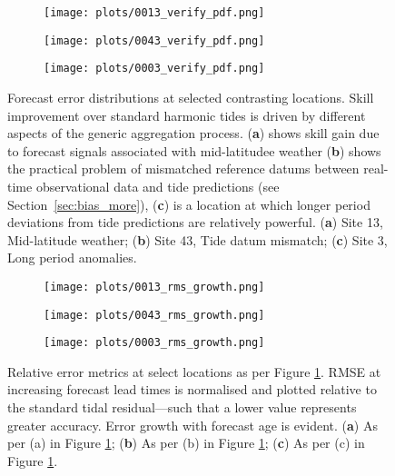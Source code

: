 \documentclass[jmse,article,accept,moreauthors,pdftex,10pt,a4paper]{mdpi}
\begin{document}
\begin{figure}[H]
    \centering
    \begin{subfigure}{0.30\textwidth}
    \texttt{[image: plots/0013\_verify\_pdf.png]}
    \caption{}
    \end{subfigure}
    \begin{subfigure}{0.30\textwidth}
    \texttt{[image: plots/0043\_verify\_pdf.png]}
    \caption{}
    \end{subfigure}
    \begin{subfigure}{0.30\textwidth}
    \texttt{[image: plots/0003\_verify\_pdf.png]}
    \caption{}
    \end{subfigure}
    \caption{ Forecast error distributions at selected contrasting locations. Skill improvement over standard harmonic tides is driven by different aspects of the generic aggregation process. (\textbf{a}) shows skill gain due to forecast signals associated with mid-latitudee weather (\textbf{b}) shows the practical problem of mismatched reference datums between real-time observational data and tide predictions (see Section~\ref{sec:bias_more}), (\textbf{c}) is a location at which longer period deviations from tide predictions are relatively powerful. (\textbf{a}) Site 13, Mid-latitude weather; (\textbf{b}) Site 43, Tide datum mismatch; (\textbf{c}) Site 3, Long period anomalies.}\vspace{-17pt}

    \label{fig:pdf}
\end{figure}   


\begin{figure}[H]
    \centering
    \begin{subfigure}{0.30\textwidth}
    \texttt{[image: plots/0013\_rms\_growth.png]}
    \caption{}
    \end{subfigure}
    \begin{subfigure}{0.30\textwidth}
    \texttt{[image: plots/0043\_rms\_growth.png]}
    \caption{}
    \end{subfigure}
    \begin{subfigure}{0.30\textwidth}
    \texttt{[image: plots/0003\_rms\_growth.png]}
    \caption{}
    \end{subfigure}
    \caption{ Relative error metrics at select locations as per Figure \ref{fig:pdf}. RMSE at increasing forecast lead times is normalised and plotted relative to the standard tidal residual---such that a lower value represents greater accuracy. Error growth with forecast age is evident. (\textbf{a}) As per (a) in Figure \ref{fig:pdf}; (\textbf{b}) As per (b) in Figure \ref{fig:pdf}; (\textbf{c}) As per (c) in Figure \ref{fig:pdf}.} \vspace{-13pt}
    \label{fig:rms}
\end{figure}   
\end{document}
